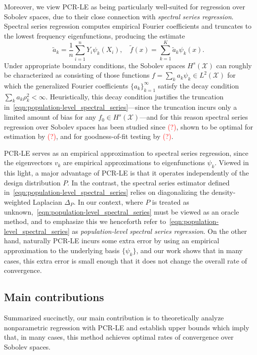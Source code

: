 \documentclass{article}
\theoremstyle{definition}
\newcommand{\wt}[1]{\widetilde{#1}}
\newcommand{\mc}[1]{\mathcal{#1}}
\newcommand{\1}{\mathbf{1}}
\begin{document}
	Moreover, we view PCR-LE as being particularly well-suited for regression over Sobolev spaces, due to their close connection with \emph{spectral series regression}. Spectral series regression computes empirical Fourier coefficients and truncates to the lowest frequency eigenfunctions, producing the estimate
	\begin{equation}
	\label{eqn:population-level_spectral_series}
	\wt{a}_k = \frac{1}{n}\sum_{i = 1}^{n} Y_i \psi_k(X_i), \quad \wt{f}(x) = \sum_{k = 1}^{K} \wt{a}_k \psi_k(x).
	\end{equation} 
	Under appropriate boundary conditions, the Sobolev spaces $H^s(\mc{X})$ can roughly be characterized as consisting of those functions $f = \sum_{k} a_k \psi_k \in L^2(\mc{X})$ for which the generalized Fourier coefficients $\{a_k\}_{k = 1}^{\infty}$ satisfy the decay condition $\sum_{k} a_k \rho_k^2 < \infty$. Heuristically, this decay condition justifies the truncation in~\eqref{eqn:population-level_spectral_series}---since the truncation incurs only a limited amount of bias for any $f_0 \in H^s(\mc{X})$---and for this reason spectral series regression over Sobolev spaces has been studied since \textcolor{red}{(?)}, shown to be optimal for estimation by \textcolor{red}{(?)}, and for goodness-of-fit testing by \textcolor{red}{(?)}.
	
	PCR-LE serves as an empirical approximation to spectral series regression, since the eigenvectors $v_k$ are empirical approximations to eigenfunctions $\psi_k$. Viewed in this light, a major advantage of PCR-LE is that it operates independently of the design distribution $P$. In the contrast, the spectral series estimator defined in~\eqref{eqn:population-level_spectral_series} relies on diagonalizing the density-weighted Laplacian $\Delta_P$. In our context, where $P$ is treated as unknown,~\eqref{eqn:population-level_spectral_series} must be viewed as an oracle method, and to emphasize this  we henceforth refer to~\eqref{eqn:population-level_spectral_series} as \emph{population-level spectral series regression}. On the other hand, naturally PCR-LE incurs some extra error by using an empirical approximation to the underlying basis $\{\psi_k\}$, and our work shows that in many cases, this extra error is small enough that it does not change the overall rate of convergence.
	
	\subsection{Main contributions}
	Summarized succinctly, our main contribution is to theoretically analyze nonparametric regression with PCR-LE and establish upper bounds which imply that, in many cases, this method achieves optimal rates of convergence over Sobolev spaces.
	
\end{document}
